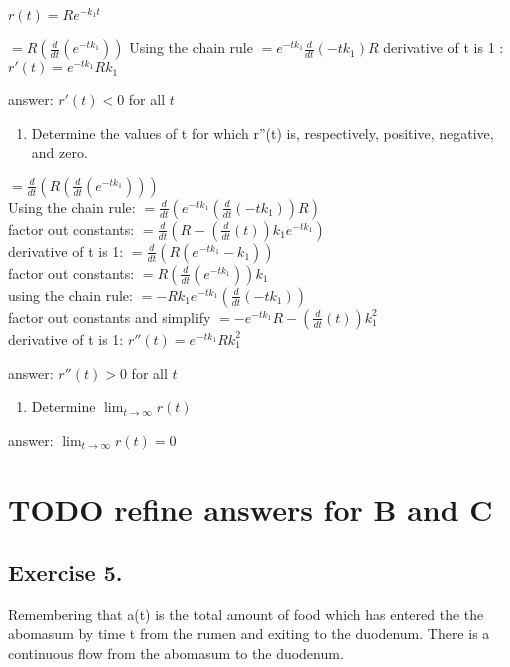 \documentclass[]{article}
\providecommand{\tightlist}{%
  \setlength{\itemsep}{0pt}\setlength{\parskip}{0pt}}
\begin{document}
\(r(t) = Re^{-k_1t}\)

\(= R(\frac{d}{dt}(e^{-tk_1}))\) Using the chain rule
\(= e^{-tk_1}\frac{d}{dt}(-tk_1)R\) derivative of t is 1 :
\(r'(t)= e^{-tk_1}Rk_1\)

answer: \(r'(t) < 0\) for all \(t\)

\begin{enumerate}
\def\labelenumi{(\alph{enumi})}
\setcounter{enumi}{1}
\tightlist
\item
  Determine the values of t for which r''(t) is, respectively, positive,
  negative, and zero.
\end{enumerate}

\(= \frac{d}{dt}(R(\frac{d}{dt}(e^{-tk_1})))\)\\
Using the chain rule:
\(= \frac{d}{dt}(e^{-tk_1}(\frac{d}{dt}(-tk_1))R)\)\\
factor out constants:
\(= \frac{d}{dt}(R -(\frac{d}{dt}(t))k_1 e^{-tk_1})\)\\
derivative of t is 1: \(= \frac{d}{dt}(R(e^{-tk_1}-k_1))\)\\
factor out constants: \(= R(\frac{d}{dt}(e^{-tk_1}))k_1\)\\
using the chain rule: \(= -Rk_1e^{-tk_1}(\frac{d}{dt}(-tk_1))\)\\
factor out constants and simplify
\(= -e^{-tk_1}R-(\frac{d}{dt}(t))k_1^2\)\\
derivative of t is 1: \(r''(t)= e^{-tk_1}Rk_1^2\)

answer: \(r''(t) > 0\) for all \(t\)

\begin{enumerate}
\def\labelenumi{(\alph{enumi})}
\setcounter{enumi}{2}
\tightlist
\item
  Determine \(\lim_{t\to\infty}r(t)\)
\end{enumerate}

answer: \(\lim_{t\to\infty}r(t) =0\)

\section{TODO refine answers for B and
C}\label{todo-refine-answers-for-b-and-c}

\subsection{Exercise 5.}\label{exercise-5.}

Remembering that a(t) is the total amount of food which has entered the
the abomasum by time t from the rumen and exiting to the duodenum. There
is a continuous flow from the abomasum to the duodenum.
\end{document}
